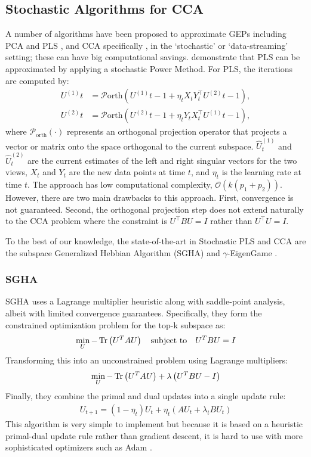 \subsection{Stochastic Algorithms for CCA}
A number of algorithms have been proposed to approximate GEPs including PCA and PLS \citep{arora2012stochastic}, and CCA specifically \citep{bhatia2018gen}, in the `stochastic' or `data-streaming' setting; these can have big computational savings.
\citet{arora2016stochastic} demonstrate that PLS can be approximated by applying a stochastic Power Method. For PLS, the iterations are computed by:
\begin{align*}
U^{(1)}t &= \mathcal{P}{\text{orth}} \left( U^{(1)}{t-1} + \eta_t X_t Y_t^\top U^{(2)}{t-1} \right), \\
U^{(2)}t &= \mathcal{P}{\text{orth}} \left( U^{(2)}{t-1} + \eta_t Y_t X_t^\top U^{(1)}{t-1} \right),
\end{align*}
where \( \mathcal{P}_{\text{orth}}(\cdot) \) represents an orthogonal projection operator that projects a vector or matrix onto the space orthogonal to the current subspace. \( \hat{U}^{(1)}_t \) and \( \hat{U}^{(2)}_t \) are the current estimates of the left and right singular vectors for the two views, \( X_t \) and \( Y_t \) are the new data points at time \( t \), and \( \eta_t \) is the learning rate at time \( t \).
The approach has low computational complexity, $\mathcal{O}(k(p_1+ p_2))$.
However, there are two main drawbacks to this approach.
First, convergence is not guaranteed.
Second, the orthogonal projection step does not extend naturally to the CCA problem where the constraint is \( U^\top B U = I \) rather than \( U^\top U = I \).

To the best of our knowledge, the state-of-the-art in Stochastic PLS and CCA are the subspace Generalized Hebbian Algorithm (SGHA) \citep{chen2019constrained} and $\gamma$-EigenGame \citep{gemp20,gemp2021}.

\subsubsection{SGHA}
SGHA uses a Lagrange multiplier heuristic along with saddle-point analysis, albeit with limited convergence guarantees.
Specifically, they form the constrained optimization problem for the top-k subspace as:
\begin{align}
\min_{U} -\operatorname{Tr} \left(U^T A U\right) \quad \text{subject to} \quad U^T B U = I
\end{align}
Transforming this into an unconstrained problem using Lagrange multipliers:
\begin{align}
\min_{U} -\operatorname{Tr}\left(U^T A U \right) + \lambda \left(U^T B U - I\right)
\end{align}
Finally, they combine the primal and dual updates into a single update rule:
\begin{align}
U_{t+1} = \left(1 - \eta_t\right) U_t + \eta_t \left(A U_t + \lambda_t B U_t\right)
\end{align}
This algorithm is very simple to implement but because it is based on a heuristic primal-dual update rule rather than gradient descent, it is hard to use with more sophisticated optimizers such as Adam \citep{kingma2014adam}.

